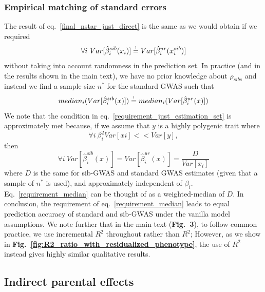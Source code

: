 \documentclass[hidelinks, 12pt]{article}
\begin{document}
\subsubsection{Empirical matching of standard errors}
\label{Empiricalmatchingofstandarderrors}
The result of eq.~\ref{final_nstar_just_direct} is the same as we would obtain if we required 
\begin{equation}
\label{requirement_just_estimation_set}
\forall i~Var[\hat{\beta}_i^{sib}(x_i)] \reqeq Var[\hat{\beta}_i^{ur}(x_i^{sib})]
\end{equation}
without taking  into account randomness in the prediction set.  In practice (and in the results shown in the main text), we have no prior knowledge about $\rho_{sibs}$ and instead we find a sample size $n^*$ for the standard GWAS such that
\begin{equation}
\label{requirement_median}
median_i(Var[\hat{\beta}_i^{sib}(x)]) \reqeq median_i(Var[\hat{\beta}_i^{ur}(x)])
\end{equation}
We note that the condition in eq.~\ref{requirement_just_estimation_set} is approximately met because, if we assume that $y$ is a highly polygenic trait where
$$ \forall i~\beta_i^2Var[xi] << Var[y],$$
then 
$$\forall i~Var[\hat{\beta}_i^{sib}(x)]=Var[\hat{\beta}_i^{ur}(x)]=\frac{D}{Var[x_i]}$$
where $D$ is the same for sib-GWAS and standard GWAS estimates (given that a sample of $n^*$ is used), and approximately independent of $\beta_i$.  Eq.~\ref{requirement_median} can be thought of as a weighted-median of $D$. In conclusion, the requirement of eq.~\ref{requirement_median} leads to equal prediction accuracy of standard and sib-GWAS under the vanilla model assumptions. 
We note further that in the main text ({\bf Fig.~3}), to follow common practice, we use incremental $R^2$ throughout rather than $R^2$; However, as we show in {\bf Fig.~\ref{fig:R2_ratio_with_residualized_phenotype}}, the use of $R^2$ instead gives highly similar qualitative results.

\pagebreak

\subsection{Indirect parental effects}
\end{document}
